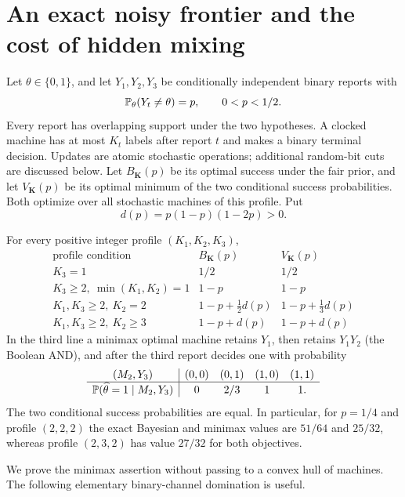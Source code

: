 \section{An exact noisy frontier and the cost of hidden mixing}
\label{sec:v23-three}
Let $\theta\in\{0,1\}$, and let $Y_1,Y_2,Y_3$ be conditionally
independent binary reports with
\[
 \mathbb P_\theta(Y_t\ne\theta)=p,\qquad 0<p<1/2.
\]
Every report has overlapping support under the two hypotheses. A
clocked machine has at most $K_t$ labels after report $t$ and makes a
binary terminal decision. Updates are atomic stochastic operations;
additional random-bit cuts are discussed below. Let $B_{\mathbf K}(p)$
be its optimal success under the fair prior, and let
$V_{\mathbf K}(p)$ be its optimal minimum of the two conditional success
probabilities. Both optimize over all stochastic machines of this
profile. Put
\[
 d(p)=p(1-p)(1-2p)>0.
\]

\begin{theorem}
\label{thm:v23-bsc}
For every positive integer profile $(K_1,K_2,K_3)$,
\begin{equation}\label{eq:v23-bsc-frontier}
\begin{array}{c|c|c}
\text{profile condition}&B_{\mathbf K}(p)&V_{\mathbf K}(p)\\\hline
K_3=1&1/2&1/2\\
K_3\ge2,\ \min(K_1,K_2)=1&1-p&1-p\\
K_1,K_3\ge2,\ K_2=2&1-p+\tfrac12d(p)&1-p+\tfrac13d(p)\\
K_1,K_3\ge2,\ K_2\ge3&1-p+d(p)&1-p+d(p)
\end{array}
\end{equation}
In the third line a minimax optimal machine retains $Y_1$, then retains
$Y_1Y_2$ (the Boolean AND), and after the third report decides one with
probability
\begin{equation}\label{eq:v23-optimal-readout}
\begin{array}{c|cccc}
(M_2,Y_3)&(0,0)&(0,1)&(1,0)&(1,1)\\\hline
\mathbb P(\widehat\theta=1\mid M_2,Y_3)&0&2/3&1&1.
\end{array}
\end{equation}
The two conditional success probabilities are equal. In particular,
for $p=1/4$ and profile $(2,2,2)$ the exact Bayesian and minimax values
are $51/64$ and $25/32$, whereas profile $(2,3,2)$ has value $27/32$
for both objectives.
\end{theorem}

We prove the minimax assertion without passing to a convex hull of
machines. The following elementary binary-channel domination is useful.

